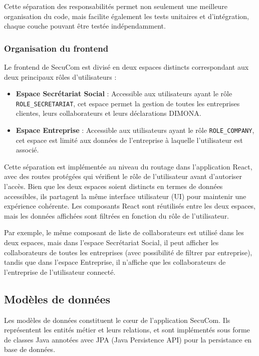 \documentclass[12pt,a4paper]{report}
\begin{document}
Cette séparation des responsabilités permet non seulement une meilleure organisation du code, mais facilite également les tests unitaires et d'intégration, chaque couche pouvant être testée indépendamment.

\subsubsection{Organisation du frontend}

Le frontend de SecuCom est divisé en deux espaces distincts correspondant aux deux principaux rôles d'utilisateurs :

\begin{itemize}
  \item \textbf{Espace Secrétariat Social} : Accessible aux utilisateurs ayant le rôle \texttt{ROLE\_SECRETARIAT}, cet espace permet la gestion de toutes les entreprises clientes, leurs collaborateurs et leurs déclarations DIMONA.
  \item \textbf{Espace Entreprise} : Accessible aux utilisateurs ayant le rôle \texttt{ROLE\_COMPANY}, cet espace est limité aux données de l'entreprise à laquelle l'utilisateur est associé.
\end{itemize}

Cette séparation est implémentée au niveau du routage dans l'application React, avec des routes protégées qui vérifient le rôle de l'utilisateur avant d'autoriser l'accès. Bien que les deux espaces soient distincts en termes de données accessibles, ils partagent la même interface utilisateur (UI) pour maintenir une expérience cohérente. Les composants React sont réutilisés entre les deux espaces, mais les données affichées sont filtrées en fonction du rôle de l'utilisateur.

Par exemple, le même composant de liste de collaborateurs est utilisé dans les deux espaces, mais dans l'espace Secrétariat Social, il peut afficher les collaborateurs de toutes les entreprises (avec possibilité de filtrer par entreprise), tandis que dans l'espace Entreprise, il n'affiche que les collaborateurs de l'entreprise de l'utilisateur connecté.

\subsection{Modèles de données}

Les modèles de données constituent le cœur de l'application SecuCom. Ils représentent les entités métier et leurs relations, et sont implémentés sous forme de classes Java annotées avec JPA (Java Persistence API) pour la persistance en base de données.
\end{document}
